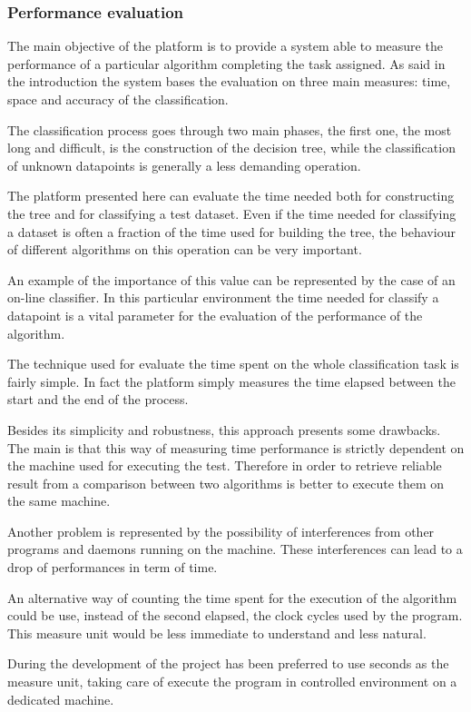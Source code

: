 \documentclass{acm_proc_article-sp-sigmod07}
\begin{document}
\subsubsection{Performance evaluation}
The main objective of the platform is to provide a system able to measure
the performance of a particular algorithm completing the task assigned.
As said in the introduction the system bases the evaluation on three main
measures: time, space and accuracy of the classification.

The classification process goes through two main phases, the first one,
the most long and difficult, is the construction of the decision tree,
while the classification of unknown datapoints is generally a less
demanding operation.

The platform presented here can evaluate the time needed both for
constructing the tree and for classifying a test dataset. 
Even if the time needed for classifying a dataset is often a fraction of
the time used for building the tree, the behaviour of different algorithms
on this operation can be very important.

An example of the importance of this value can be represented by the case
of an on-line classifier. In this particular environment the time needed
for classify a datapoint is a vital parameter for the evaluation of the
performance of the algorithm.

The technique used for evaluate the time spent on the whole classification
task is fairly simple. In fact the platform simply measures the time
elapsed between the start and the end of the process.

Besides its simplicity and robustness, this approach presents some
drawbacks. The main is that this way of measuring time performance is
strictly dependent on the machine used for executing the test.
Therefore in order to retrieve reliable result from a comparison between
two algorithms is better to execute them on the same machine.

Another problem is represented by the possibility of interferences from
other programs and daemons running on the machine. These interferences can
lead to a drop of performances in term of time.

An alternative way of counting the time spent for the execution of the
algorithm could be use, instead of the second elapsed, the clock cycles
used by the program. 
This measure unit would be less immediate to understand and less natural.

During the development of the project has been preferred to use seconds as
the measure unit, taking care of execute the program in controlled
environment on a dedicated machine.
\end{document}
